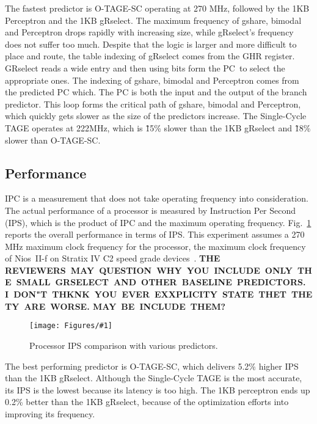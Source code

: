 \documentclass[conference]{IEEEtran}
\newcommand{\kfig}[4]{ %
        \begin{figure}[!t]
        \centering
        \texttt{[image: Figures/\#1]}
        \vspace{-1mm}
        \caption{#3}
        \label{#2}
        \end{figure}
}
\begin{document}
The fastest predictor is \mbox{O-TAGE-SC} operating at 270 MHz, followed by the 1KB Perceptron and the 1KB gRselect. The maximum frequency of gshare, bimodal and Perceptron drops rapidly with increasing size, while gRselect's frequency does not suffer too much. Despite that the logic is larger and more difficult to place and route,  the table indexing of gRselect comes from the GHR register. GRselect reads a wide entry and then using bits form the PC\ to select the appropriate ones. The indexing of gshare, bimodal and Perceptron comes from the predicted PC which. The PC  is both the input and the output of the branch predictor. This loop forms the critical path of gshare, bimodal and Perceptron, which quickly gets slower as the size of the predictors increase. The Single-Cycle TAGE operates at 222MHz, which is \~15\% slower than the 1KB gRselect and \~18\% slower than \mbox{O-TAGE-SC}.



\subsection{Performance}
\label{sec:eval:perf}
IPC is a measurement that does not take operating frequency into consideration. The actual performance of a processor is measured by Instruction Per Second (IPS), which is the product of IPC and the maximum operating frequency. Fig.~\ref{fig:adips} reports the overall performance in terms of IPS. This experiment assumes a 270 MHz maximum clock frequency for the processor, the maximum clock frequency of Nios~II-f on Stratix IV C2 speed grade devices~\cite{niosfmax}.
\textbf{THE REVIEWERS\ MAY\ QUESTION\ WHY\ YOU\ INCLUDE\ ONLY\ THE\ SMALL\ GRSELECT\ AND\ OTHER\ BASELINE\ PREDICTORS. I\ DON"T\ THKNK\ YOU\ EVER\ EXXPLICITY\  STATE\ THET\ THETY\ ARE\ WORSE. MAY\ BE\ INCLUDE\ THEM?\ }\kfig{adips.pdf}{fig:adips}{Processor IPS comparison with various predictors.}{angle = 0, trim = 1in 1.8in 0.7in 1.8in, clip, width=0.5\textwidth}

The best performing predictor is \mbox{O-TAGE-SC}, which delivers 5.2\% higher IPS than the 1KB gRselect. Although the Single-Cycle TAGE is the most accurate, its IPS is the lowest because its latency is too high. The 1KB perceptron ends up 0.2\% better than the 1KB gRselect, because of the optimization efforts into improving its frequency. 

\end{document}
